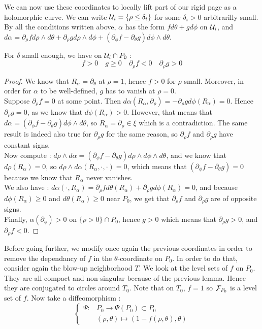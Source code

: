 \documentclass[../main.tex]{subfiles}
\begin{document}
We can now use these coordinates to locally lift part of our rigid page as a holomorphic curve. We can write $\mathcal{U}_i = \{\rho\leq \delta_i\}$ for some $\delta_i> 0$ arbitrarilly small. By all the conditions written above, $\alpha$ has the form $fd\theta + gd\phi$ on $\mathcal{U}_i$, and $d\alpha = \partial_\rho f d\rho \wedge d\theta + \partial_\rho g d\rho \wedge d\phi + (\partial_\phi f - \partial_\theta g) d\phi\wedge d\theta$. 
\begin{lemma}
For $\delta$ small enough, we have on $\mathcal{U}_i\cap P_0$ : $$f>0 \quad g\geq 0\quad\partial_\rho f < 0\quad\partial_\rho g > 0$$
\end{lemma}

\begin{proof}
We know that $R_\alpha = \partial_\theta$ at $\rho = 1$, hence $f> 0$ for $\rho$ small. Moreover, in order for $\alpha$ to be well-defined, $g$ has to vanish at $\rho = 0$.\\

Suppose $\partial_\rho f = 0$ at some point. Then $d\alpha(R_\alpha,\partial_\rho) = -\partial_\rho g d\phi(R_\alpha) = 0$. Hence $\partial_\rho g = 0$, as we know that $d\phi(R_\alpha) > 0$. However, that means that $d\alpha = (\partial_\phi f -\partial_\theta g)d\phi\wedge d\theta$, so $R_\alpha = \partial_\rho \in \xi$ which is a contradiction. The same result is indeed also true for $\partial_\rho g$ for the same reason, so $\partial_\rho f$ and $\partial_\rho g$ have constant signs. \\

Now compute : $d\rho\wedge d\alpha = (\partial_\phi f - \partial_\theta g) d\rho \wedge d\phi \wedge d\theta$, and we know that $d\rho(R_\alpha) = 0$, so $d\rho\wedge d\alpha(R_\alpha,\cdot,\cdot) = 0$, which means that $(\partial_\phi f - \partial_\theta g) = 0$ because we know that $R_\alpha$ never vanishes.\\

We also have : $d\alpha(\cdot,R_\alpha) = \partial_\rho f d\theta(R_\alpha) + \partial_\rho g d\phi(R_\alpha) = 0$, and because $d\phi(R_\alpha) \geq0$ and $d\theta(R_\alpha) \geq0$ near $P_0$, we get that $\partial_\rho f $ and $\partial_\rho g$ are of opposite signs. \\

Finally, $\alpha(\partial_\phi) > 0$ on $\{\rho > 0\}\cap P_0$, hence $g> 0$ which means that $\partial_\rho g > 0$, and $\partial_\rho f < 0$. 

\end{proof}
Before going further, we modify once again the previous coordinates in order to remove the dependancy of $f$ in the $\theta$-coordinate on $P_0$. In order to do that, consider again the blow-up neighborhood $T$. We look at the level sets of $f$ on $P_0$. They are all compact and non-singular because of the previous lemma. Hence they are conjugated to circles around $T_0$. Note that on $T_0$, $f = 1$ so $\mathcal{F}_{P_0}$ is a level set of $f$. Now take a diffeomorphism :
$$\left\{
    \begin{array}{ll}
        \Psi : &P_0 \rightarrow  \Psi(P_0)\subset P_0\\
               &(\rho,\theta)\mapsto (1-f(\rho,\theta),\theta) 
    \end{array}
\right.$$
\end{document}
